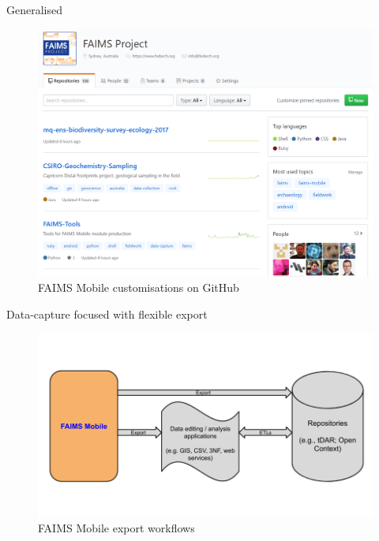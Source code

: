 \begin{frame}{Generalised}
 \begin{figure}[H]
    \centering
        \vspace{-0.5cm}

        \includegraphics[height=.75\textheight]{figures/FAIMS-generalised.png}
        \caption{FAIMS Mobile customisations on GitHub}
        \label{fig:FAIMS-github}
 \end{figure}
\end{frame}

\begin{frame}{Data-capture focused with flexible export}
 \begin{figure}[H]
    \centering
            \vspace{-0.5cm}

        \includegraphics[height=.75\textheight]{figures/FAIMS-federation}
        \caption{FAIMS Mobile export workflows}
        \label{fig:FAIMS-federation}
 \end{figure}
\end{frame}


